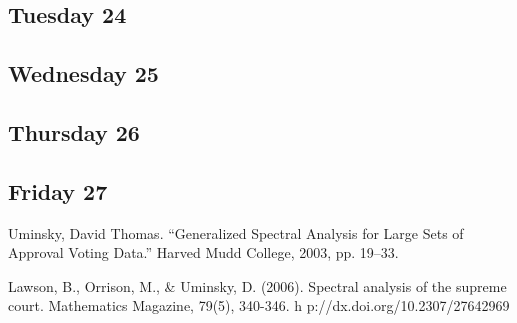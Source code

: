 \documentclass{article}
\begin{document}
\subsection{Tuesday 24}

\subsection{Wednesday 25}

\subsection{Thursday 26}

\subsection{Friday 27}

\begin{thebibliography}{3}
 Uminsky, David Thomas. “Generalized Spectral Analysis for Large Sets of Approval Voting Data.” Harved Mudd College, 2003, pp. 19–33.

 Lawson, B., Orrison, M., & Uminsky, D. (2006). Spectral analysis of the supreme court. Mathematics Magazine, 79(5), 340-346. h p://dx.doi.org/10.2307/27642969


\end{thebibliography}
\end{document}
